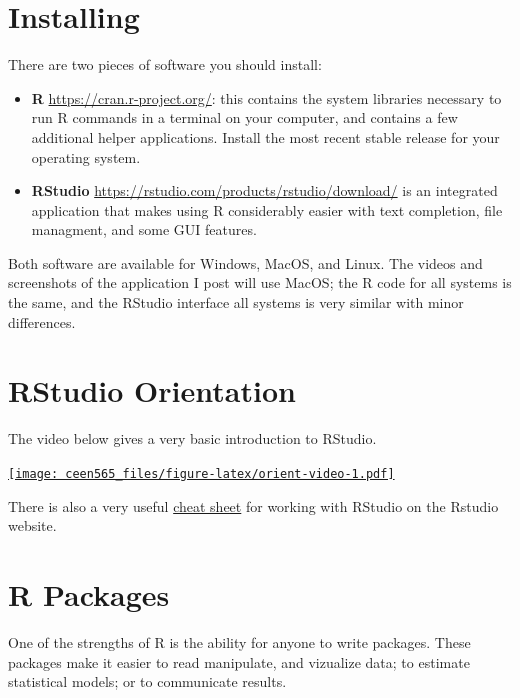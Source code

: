 \documentclass[]{book}
\providecommand{\tightlist}{%
  \setlength{\itemsep}{0pt}\setlength{\parskip}{0pt}}
\begin{document}
\hypertarget{installing}{%
\section{Installing}\label{installing}}

There are two pieces of software you should install:

\begin{itemize}
\tightlist
\item
  \textbf{R} \url{https://cran.r-project.org/}: this contains
  the system libraries necessary to run R commands in a terminal on your computer,
  and contains a few additional helper applications. Install the most recent
  stable release for your operating system.
\item
  \textbf{RStudio} \url{https://rstudio.com/products/rstudio/download/} is an integrated application that makes using R considerably easier
  with text completion, file managment, and some GUI features.
\end{itemize}

Both software are available for Windows, MacOS, and Linux. The videos and screenshots
of the application I post will use MacOS; the R code for all systems is the same,
and the RStudio interface all systems is very similar with minor differences.

\hypertarget{rstudio-orientation}{%
\section{RStudio Orientation}\label{rstudio-orientation}}

The video below gives a very basic introduction to RStudio.

\href{https://www.youtube.com/embed/c3xv8wOIj-g}{\texttt{[image: ceen565\_files/figure-latex/orient-video-1.pdf]}}

There is also a very useful \href{https://resources.rstudio.com/rstudio-cheatsheets/rstudio-ide-cheat-sheet}{cheat sheet}
for working with RStudio on the Rstudio website.

\hypertarget{r-packages}{%
\section{R Packages}\label{r-packages}}

One of the strengths of R is the ability for anyone to write packages. These
packages make it easier to read manipulate, and vizualize data; to estimate
statistical models; or to communicate results.
\end{document}
